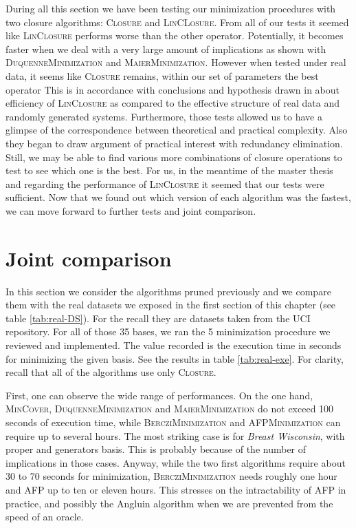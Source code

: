 During all this section we have been testing our minimization procedures with two closure algorithms: \textsc{Closure} and \textsc{LinCLosure}. From all of
our tests it seemed like \textsc{LinClosure} performs worse than the 
other operator. Potentially, it becomes faster when we deal with a very large amount of implications as shown with \textsc{DuquenneMinimization} and \textsc{MaierMinimization}. However when tested under real data, it seems like \textsc{Closure} remains, within our set of parameters the best operator This is in accordance with conclusions and hypothesis drawn in
\cite{bazhanov_optimizations_2014} about efficiency of \textsc{LinClosure} as compared to the effective structure of real data and randomly generated systems. Furthermore, those tests allowed us to have a glimpse of the correspondence between theoretical and practical complexity. Also they began to draw argument of practical interest with redundancy elimination. Still, we may be able to find various more combinations of closure operations to test to see which one is the best. For us, in the meantime of the master thesis and regarding the performance of \textsc{LinClosure} it seemed that our tests were sufficient. Now that we found out which version of each algorithm was the fastest, we can move forward to further tests and joint comparison.

\begin{figure}[H]
	
\end{figure}


\section{Joint comparison}

In this section we consider the algorithms pruned previously and we compare them
with the real datasets we exposed in the first section of this chapter (see table \ref{tab:real-DS}). For the recall they are datasets taken from the UCI 
repository. For all of those 35 bases, we ran the 5 minimization procedure
we reviewed and implemented. The value recorded is the execution time in seconds
for minimizing the given basis. See the results in table \ref{tab:real-exe}. For clarity, recall that all of the algorithms use only \textsc{Closure}.

\vspace{1.2em}

First, one can observe the wide range of performances. On the one hand,
\textsc{MinCover}, \textsc{DuquenneMinimization}  and \textsc{MaierMinimization} do not exceed 100 seconds of execution time, while \textsc{BercziMinimization} and \textsc{AFPMinimization} can require up to several hours. The most striking case is for \textit{Breast Wisconsin}, with proper and generators basis. This is probably because of the number of implications in those cases. Anyway, while the two first algorithms require about 30 to 70 seconds for minimization, \textsc{BercziMinimization} needs roughly one hour and \textsc{AFP} up to ten or eleven hours. This stresses on the intractability of \textsc{AFP} in practice, and possibly the Angluin algorithm when we are prevented from the speed of an oracle.

